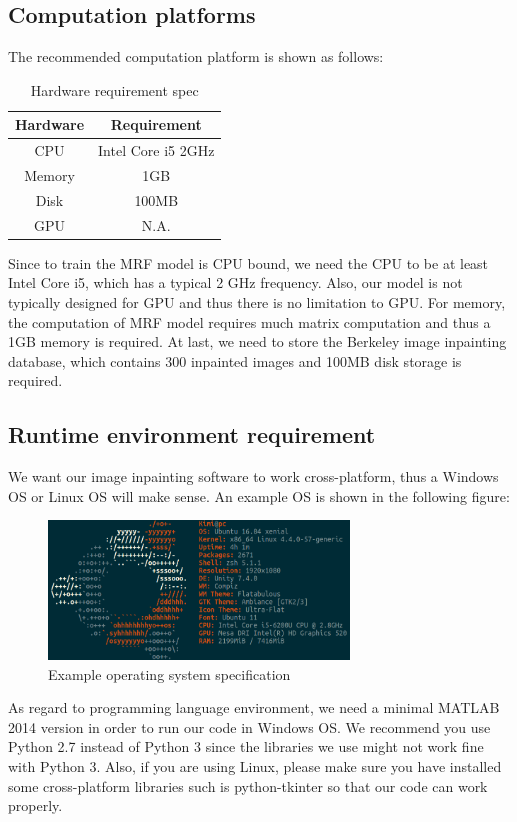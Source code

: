\subsection{Computation platforms}
The recommended computation platform is shown as follows:
\begin{table}[H]
\centering
\begin{tabular}{|c|c|}
\hline
Hardware & Requirement \\ \hline
CPU & Intel Core i5 2GHz \\ \hline
Memory & 1GB \\ \hline
Disk & 100MB \\ \hline
GPU & N.A. \\ \hline
\end{tabular}
\caption{Hardware requirement spec}
\end{table}
Since to train the MRF model is CPU bound, we need the CPU to be at least Intel Core i5, which has a typical 2 GHz frequency. Also, our model is not typically designed for GPU and thus there is no limitation to GPU. For memory, the computation of MRF model requires much matrix computation and thus a 1GB memory is required. At last, we need to store the Berkeley image inpainting database, which contains 300 inpainted images and 100MB disk storage is required.
\subsection{Runtime environment requirement}
We want our image inpainting software to work cross-platform, thus a Windows OS or Linux OS will make sense. An example OS is shown in the following figure:
\begin{figure}[H]
\centering
\includegraphics[width=8cm]{ubuntu.png}
\caption{Example operating system specification}
\end{figure}

As regard to programming language environment, we need a minimal MATLAB 2014 version in order to run our code in Windows OS. We recommend you use Python 2.7 instead of Python 3 since the libraries we use might not work fine with Python 3. Also, if you are using Linux, please make sure you have installed some cross-platform libraries such is python-tkinter so that our code can work
properly.

